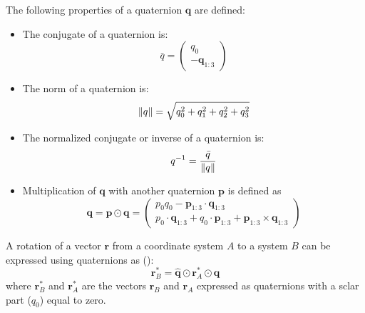 The following properties of a quaternion $\bm{q}$ are defined:
\begin{itemize}
  \item The conjugate of a quaternion is:
  \begin{equation}
    \bar{q} = \begin{pmatrix} q_0 \\ -\bm{q}_{1:3} \end{pmatrix}
  \end{equation}

  \item The norm of a quaternion is:
  \begin{equation}
    \lVert q\rVert = \sqrt{ q_0^2 + q_1^2 + q_2^2 + q_3^2}
  \end{equation}

  \item The normalized conjugate or inverse of a quaternion is:
  \begin{equation}
    q^{-1} = \frac{\bar{q}}{\lVert q\rVert}
  \end{equation}

  \item Multiplication of $\bm{q}$ with another quaternion $\bm{p}$ is defined as
  \begin{equation}
    \bm{q} = \bm{p} \odot \bm{q} = 
    \begin{pmatrix}
      p_0 q_0 - \bm{p}_{1:3} \cdot \bm{q}_{1:3} \\
      p_0 \cdot \bm{q}_{1:3} + q_0 \cdot \bm{p}_{1:3} + \bm{p}_{1:3} \times \bm{q}_{1:3}
    \end{pmatrix}
  \end{equation}
\end{itemize}

A rotation of a vector $\bm{r}$ from a coordinate system $A$ to a system $B$ can 
be expressed using quaternions as (\cite{Zeitlhofler2019}):
\begin{equation}
  \bm{r}^{\ast}_B = \hat{\bm{q}} \odot \bm{r}^{\ast}_A \odot \bm{q}
\end{equation}
where $\bm{r}^{\ast}_B$ and $\bm{r}^{\ast}_A$ are the vectors $\bm{r}_B$ and $\bm{r}_A$ 
expressed as quaternions with a sclar part ($q_0$) equal to zero.
